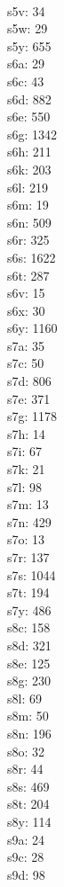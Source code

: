 \begin{multicols}{8}
  \\s5v: 34
  \\s5w: 29
  \\s5y: 655
  \\s6a: 29
  \\s6c: 43
  \\s6d: 882
  \\s6e: 550
  \\s6g: 1342
  \\s6h: 211
  \\s6k: 203
  \\s6l: 219
  \\s6m: 19
  \\s6n: 509
  \\s6r: 325
  \\s6s: 1622
  \\s6t: 287
  \\s6v: 15
  \\s6x: 30
  \\s6y: 1160
  \\s7a: 35
  \\s7c: 50
  \\s7d: 806
  \\s7e: 371
  \\s7g: 1178
  \\s7h: 14
  \\s7i: 67
  \\s7k: 21
  \\s7l: 98
  \\s7m: 13
  \\s7n: 429
  \\s7o: 13
  \\s7r: 137
  \\s7s: 1044
  \\s7t: 194
  \\s7y: 486
  \\s8c: 158
  \\s8d: 321
  \\s8e: 125
  \\s8g: 230
  \\s8l: 69
  \\s8m: 50
  \\s8n: 196
  \\s8o: 32
  \\s8r: 44
  \\s8s: 469
  \\s8t: 204
  \\s8y: 114
  \\s9a: 24
  \\s9c: 28
  \\s9d: 98

\end{multicols}
